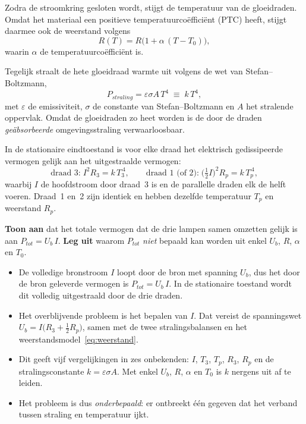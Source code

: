 \documentclass[addpoints,11pt,a4paper]{exam}
\begin{document}
\begin{questions}
Zodra de stroomkring gesloten wordt, stijgt de temperatuur van de gloeidraden. Omdat het materiaal een positieve temperatuurco\"effici\"ent (PTC) heeft, stijgt daarmee ook de weerstand volgens
\begin{equation}
R(T) = R\bigl(1 + \alpha\,(T - T_0)\bigr),
\label{eq:weerstand}
\end{equation}
waarin $\alpha$ de temperatuurco\"effici\"ent is.

Tegelijk straalt de hete gloeidraad warmte uit volgens de wet van Stefan--Boltzmann,
\begin{equation}
P_{straling} = \varepsilon\sigma A\,T^4 \;\equiv\; k\,T^4,
\label{eq:stralen}
\end{equation}
met $\varepsilon$ de emissiviteit, $\sigma$ de constante van Stefan--Boltzmann en $A$ het stralende oppervlak. Omdat de gloeidraden zo heet worden is de door de draden \emph{ge\"absorbeerde} omgevingsstraling verwaarloosbaar.

In de stationaire eindtoestand is voor elke draad het elektrisch gedissipeerde vermogen gelijk aan het uitgestraalde vermogen:
\[
\text{draad 3:}\; I^2 R_3 = k\,T_3^{\,4}, \qquad
\text{draad 1 (of 2):}\; \bigl(\tfrac{1}{2}I\bigr)^{\!2} R_p = k\,T_p^{\,4},
\]
waarbij $I$ de hoofdstroom door draad~3 is en de parallelle draden elk de helft voeren. Draad~1 en~2 zijn identiek en hebben dezelfde temperatuur $T_p$ en weerstand $R_p$.

\question[4]
\textbf{Toon aan} dat het totale vermogen dat de drie lampen samen omzetten gelijk is aan $P_{tot} = U_b\,I$. \textbf{Leg uit} waarom $P_{tot}$ \emph{niet} bepaald kan worden uit enkel $U_b$, $R$, $\alpha$ en $T_0$.

\begin{solution}
\begin{itemize}
  \item De volledige bronstroom $I$ loopt door de bron met spanning $U_b$, dus het door de bron geleverde vermogen is $P_{tot} = U_b\,I$. In de stationaire toestand wordt dit volledig uitgestraald door de drie draden.
  \item Het overblijvende probleem is het bepalen van $I$. Dat vereist de spanningswet $U_b = I\bigl(R_3 + \tfrac{1}{2}R_p\bigr)$, samen met de twee stralingsbalansen en het weerstandsmodel~\eqref{eq:weerstand}.
  \item Dit geeft vijf vergelijkingen in zes onbekenden: $I$, $T_3$, $T_p$, $R_3$, $R_p$ en de stralingsconstante $k = \varepsilon\sigma A$. Met enkel $U_b$, $R$, $\alpha$ en $T_0$ is $k$ nergens uit af te leiden.
  \item Het probleem is dus \emph{onderbepaald}: er ontbreekt \'e\'en gegeven dat het verband tussen straling en temperatuur ijkt.
\end{itemize}
\end{solution}


\end{questions}
\end{document}
